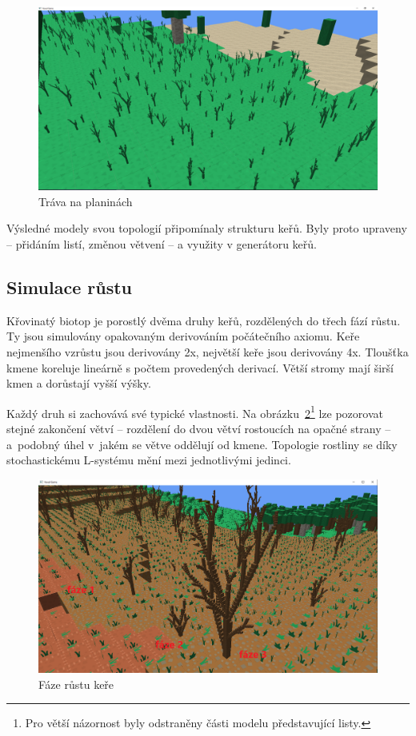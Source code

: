 \documentclass[thesis=M,czech]{FITthesis}[2019/12/23]
\begin{document}
\begin{figure}\centering
	\includegraphics[width=\textwidth]{images/grass_plains}
	\caption[Tráva na planinách]{Tráva na planinách}\label{fig:grass_plains}
\end{figure}

Výsledné modely svou topologií připomínaly strukturu keřů. Byly proto upraveny -- přidáním listí, změnou větvení -- a využity v generátoru keřů.

\subsection{Simulace růstu}
Křovinatý biotop je porostlý dvěma druhy keřů, rozdělených do třech fází růstu. Ty jsou simulovány opakovaným derivováním počátečního axiomu. Keře nejmenšího vzrůstu jsou derivovány 2x, největší keře jsou derivovány 4x. Tloušťka kmene koreluje lineárně s počtem provedených derivací. Větší stromy mají širší kmen a dorůstají vyšší výšky.

Každý druh si zachovává své typické vlastnosti. Na obrázku~\ref{fig:shrub_evolution}\footnote{Pro větší názornost byly odstraněny části modelu představující listy.}  lze pozorovat stejné zakončení větví -- rozdělení do dvou větví rostoucích na opačné strany -- a~podobný úhel v~jakém se větve oddělují od kmene. Topologie rostliny se díky stochastickému L-systému mění mezi jednotlivými jedinci.

\begin{figure}\centering
	\includegraphics[width=\textwidth]{images/shrub_evolution}
	\caption[Fáze růstu keře]{Fáze růstu keře}\label{fig:shrub_evolution}
\end{figure}
\end{document}
